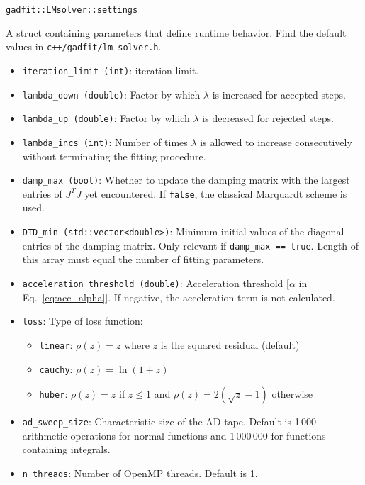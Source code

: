 \documentclass{article}
\begin{document}
\begin{verbatim}
gadfit::LMsolver::settings
\end{verbatim}
A struct containing parameters that define runtime behavior. Find the default values in \texttt{c++/gadfit/lm\_solver.h}.
\begin{itemize}
\item \verb+iteration_limit (int)+: iteration limit.
\item \verb+lambda_down (double)+: Factor by which $\lambda$ is increased for accepted steps.
\item \verb+lambda_up (double)+: Factor by which $\lambda$ is decreased for rejected steps.
\item \verb+lambda_incs (int)+: Number of times $\lambda$ is allowed to increase consecutively without terminating the fitting procedure.
\item \verb+damp_max (bool)+: Whether to update the damping matrix with the largest entries of $J^TJ$ yet encountered. If \texttt{false}, the classical Marquardt scheme is used.
\item \verb+DTD_min (std::vector<double>)+: Minimum initial values of the diagonal entries of the damping matrix. Only relevant if \verb+damp_max == true+. Length of this array must equal the number of fitting parameters.
\item \verb+acceleration_threshold (double)+: Acceleration threshold [$\alpha$ in Eq.~\eqref{eq:acc_alpha}]. If negative, the acceleration term is not calculated.
\item \verb+loss+: Type of loss function:
  \begin{itemize}
  \item \verb+linear+: $\rho(z) = z$ where $z$ is the squared residual (default)
  \item \verb+cauchy+: $\rho(z) = \ln(1 + z)$
  \item \verb+huber+: $\rho(z) = z$ if $z \le 1$ and $\rho(z) = 2(\sqrt z - 1)$ otherwise
  \end{itemize}
\item \verb+ad_sweep_size+: Characteristic size of the AD tape. Default is 1\,000 arithmetic operations for normal functions and 1\,000\,000 for functions containing integrals.
\item \verb+n_threads+: Number of OpenMP threads. Default is 1.
\end{itemize}
\end{document}
